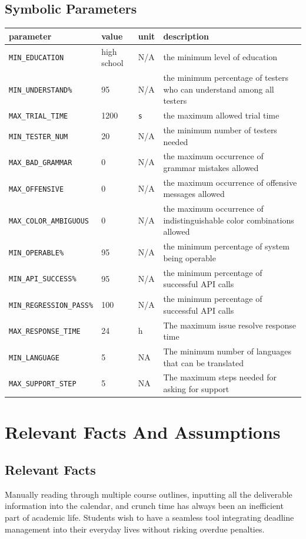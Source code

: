 \documentclass[12pt]{article}
\begin{document}
\subsection{Symbolic Parameters}

\begin{tabular}{|l|l|l|p{5cm}|}

\hline
parameter & value & unit & description\\
\hline
\texttt{MIN\_EDUCATION} & high school & N/A & the minimum level of education\\
\hline
\texttt{MIN\_UNDERSTAND\%} & 95 & N/A & the minimum percentage of testers who can understand among all testers\\
\hline
\texttt{MAX\_TRIAL\_TIME} & 1200 & \texttt{s} & the maximum allowed trial time\\
\hline
\texttt{MIN\_TESTER\_NUM} &  20& N/A & the minimum number of testers needed\\
\hline
\texttt{MAX\_BAD\_GRAMMAR} & 0& N/A & the maximum occurrence of grammar mistakes allowed \\
\hline
\texttt{MAX\_OFFENSIVE} & 0& N/A & the maximum occurrence of offensive messages allowed\\
\hline
\texttt{MAX\_COLOR\_AMBIGUOUS} & 0& N/A & the maximum occurrence of indistinguishable color combinations allowed\\
\hline
\texttt{MIN\_OPERABLE\%} & 95 & N/A & the minimum percentage of system being operable \\
\hline
\texttt{MIN\_API\_SUCCESS\%} & 95 & N/A &  the minimum percentage of successful API calls\\
\hline
\texttt{MIN\_REGRESSION\_PASS\%} & 100  & N/A &  the minimum percentage of successful API calls\\
\hline
\texttt{MAX\_RESPONSE\_TIME} & 24 & h & The maximum issue resolve response time\\
\hline
\texttt{MIN\_LANGUAGE}& 5& NA & The minimum number of languages that can be translated\\
\hline
\texttt{MAX\_SUPPORT\_STEP} & 5&NA& The maximum steps needed for asking for support\\
\hline
\end{tabular}


\section{Relevant Facts And Assumptions}
\subsection{Relevant Facts}
Manually reading through multiple course outlines, inputting all the deliverable information into the calendar, and crunch time has always been an inefficient part of academic life. Students wish to have a seamless tool integrating deadline management into their everyday lives without risking overdue penalties.
\end{document}
